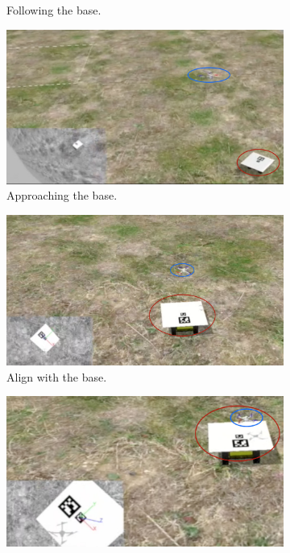 \begin{figure}[!htbp]
\begin{subfigure}[b]{0.45\textwidth}
        \caption{Following the base.}
        \label{fig:three}
   \end{subfigure}\hfill
    \begin{subfigure}[b]{0.45\textwidth}
        \includegraphics[width=\textwidth]{img/approaching3.jpg}
        \caption{Approaching the base.}
        \label{fig:three}
   \end{subfigure}\hfill
   \begin{subfigure}[b]{0.45\textwidth}
        \includegraphics[width=\textwidth]{img/align3.jpg}
        \caption{Align with the base.}
        \label{fig:three}
   \end{subfigure}\hfill
    \begin{subfigure}[b]{0.45\textwidth}
        \includegraphics[width=\textwidth]{img/landing3.jpg}

\end{subfigure}
\end{figure}
